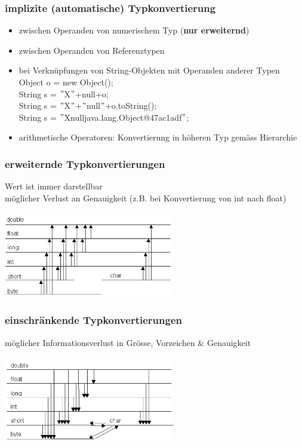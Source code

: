 \documentclass[a4paper,10pt]{article}
\newcommand{\Bold}[1]{\textbf{#1}} %
\begin{document}
\subsubsection{implizite (automatische) Typkonvertierung}
\begin{itemize}
	\item zwischen Operanden von numerischem Typ (\Bold {nur erweiternd})
	\item zwischen Operanden von Referenztypen
	\item bei Verkn\"upfungen von String-Objekten mit Operanden anderer Typen \\
			    Object o = new Object();\\
			    String s = $"$X$"$+null+o;\\
			   String s = $"$X$"$+$"$null$"$+o.toString();\\
                                   String s = $"$Xnulljava.lang.Object@47ac1adf$"$;
	\item arithmetische Operatoren: Konvertierung in h\"oheren Typ gem\"ass Hierarchie
\end{itemize}

\subsubsection{erweiternde Typkonvertierungen}
		Wert ist immer darstellbar \\
		m\"oglicher Verlust an Genauigkeit (z.B. bei Konvertierung von int nach float) \\ \\
		\includegraphics[width=75mm]{erweiternde_typumwandlung.png} \\
		
\subsubsection{einschr\"ankende Typkonvertierungen}
		m\"oglicher Informationsverlust in Gr\"osse, Vorzeichen \& Genauigkeit \\ \\
		\includegraphics[width=75mm]{einschraenkende_typumwandlung.png}
\end{document}
